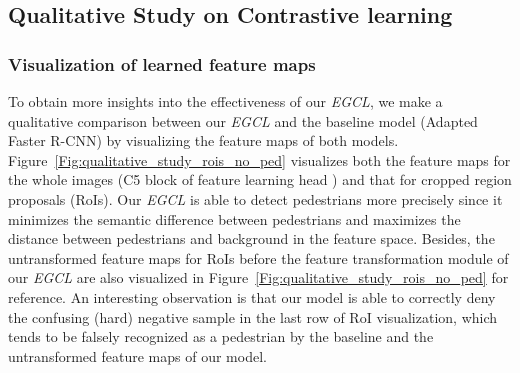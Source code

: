 \documentclass[journal]{IEEEtran}
\newcommand{\MR}[1]{\textcolor[rgb]{0,0,0} {#1}}
\begin{document}
\begin{comment}
\begin{table}[!t]
\centering
\caption{Performance ( in terms of ) of our \emph{EGCL} and other methods on NightOwls validation subset (lower is better).}
\renewcommand\arraystretch{0.8} 
\resizebox{0.6\linewidth}{!}{
\begin{tabular}{l| c c }
\toprule[0.13mm]
\multicolumn{1}{l|}{Methods}&\multicolumn{1}{c}{Backbone} &\multicolumn{1}{c}{\textbf{\tiny Reasonable}} \\
\midrule[0.08mm]
\tiny ACF~\cite{dollar2014fast} & \tiny -- & \tiny 51.68\\
\tiny Checkerboards~\cite{zhang2015filtered}  & \tiny -- & \tiny 39.67 \\
\tiny Vanilla Faster R-CNN~\cite{ren2016faster} & \tiny VGG-16 & \tiny 20.00 \\
\tiny Adapted Faster R-CNN~\cite{zhang2017citypersons} &\tiny VGG-16&\tiny 18.81 \\
\tiny RPN+BF~\cite{zhang2016faster}   & \tiny VGG-16          &         \tiny 23.26    \\
 SDS-RCNN~\cite{brazil2017illuminating}    & \tiny VGG-16          &    \tiny 17.80  \\        
 \MR{TFAN~\cite{wu2020temporal}}    & \MR{ResNet-50}         &     \MR{16.50} \\
\tiny \emph{EGCL} (ours)   & \tiny VGG-16         & \textbf{\tiny 15.93}\\                               
\bottomrule[0.13mm]
\end{tabular}
}
\label{tab:comparison_nightowls}
\end{table}
\end{comment}

\subsection{Qualitative Study on Contrastive learning}
\subsubsection{Visualization of learned feature maps} To obtain more insights into the effectiveness of our \emph{EGCL}, we make a qualitative comparison between our \emph{EGCL} and the baseline model (Adapted Faster R-CNN)  by visualizing the feature maps of both models. Figure~\ref{Fig:qualitative_study_rois_no_ped} visualizes both the feature maps for the whole images (C5 block of feature learning head ) and that for cropped region proposals (RoIs). Our \emph{EGCL} is able to detect pedestrians more precisely since it minimizes the semantic difference between pedestrians and maximizes the distance between pedestrians and background in the feature space. Besides, the untransformed feature maps for RoIs before the feature transformation module of our \emph{EGCL} are also visualized in Figure~\ref{Fig:qualitative_study_rois_no_ped} for reference. An interesting observation is that  our model is able to correctly deny the confusing (hard) negative sample in the last row of RoI visualization, which tends to be falsely recognized as a pedestrian by the baseline and the untransformed feature maps of our model.
\end{document}
